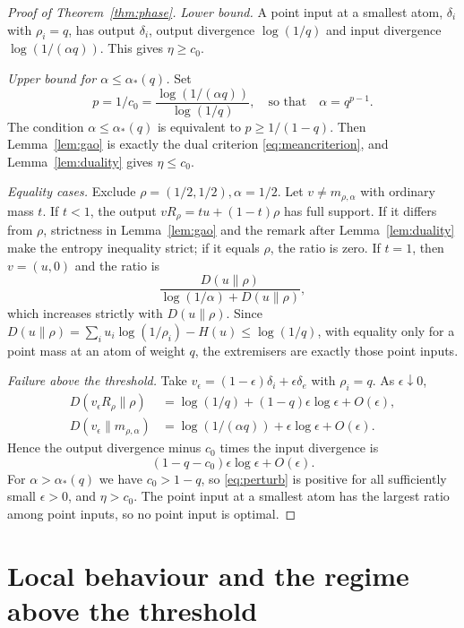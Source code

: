 \documentclass[11pt,a4paper]{article}
\numberwithin{equation}{section}
\theoremstyle{definition}
\theoremstyle{remark}
\newcommand{\KL}{D}
\newcommand{\mra}{m_{\rho,\alpha}}
\newcommand{\ac}{\alpha_*}
\begin{document}
\begin{proof}[Proof of Theorem~\ref{thm:phase}]
\emph{Lower bound.} A point input at a smallest atom, \(\delta_i\) with
\(\rho_i=q\), has output \(\delta_i\), output divergence \(\log(1/q)\) and
input divergence \(\log(1/(\alpha q))\). This gives \(\eta\ge c_0\).

\emph{Upper bound for \(\alpha\le\ac(q)\).} Set
\[
p=1/c_0=\frac{\log(1/(\alpha q))}{\log(1/q)},
\quad\text{so that}\quad \alpha=q^{p-1}.
\]
The condition \(\alpha\le\ac(q)\) is equivalent to \(p\ge1/(1-q)\). Then
Lemma~\ref{lem:gao} is exactly the dual criterion \eqref{eq:meancriterion},
and Lemma~\ref{lem:duality} gives \(\eta\le c_0\).

\emph{Equality cases.} Exclude \(\rho=(1/2,1/2),\alpha=1/2\). Let
\(v\ne\mra\) with ordinary mass \(t\). If \(t<1\), the output
\(vR_\rho=tu+(1-t)\rho\) has full support. If it differs from \(\rho\),
strictness in Lemma~\ref{lem:gao} and the remark after
Lemma~\ref{lem:duality} make the entropy inequality strict; if it equals
\(\rho\), the ratio is zero. If \(t=1\), then \(v=(u,0)\) and the ratio is
\[
\frac{\KL(u\|\rho)}{\log(1/\alpha)+\KL(u\|\rho)},
\]
which increases strictly with \(\KL(u\|\rho)\). Since
\(\KL(u\|\rho)=\sum_iu_i\log(1/\rho_i)-H(u)\le\log(1/q)\), with equality
only for a point mass at an atom of weight \(q\), the extremisers are
exactly those point inputs.

\emph{Failure above the threshold.} Take
\(v_\epsilon=(1-\epsilon)\delta_i+\epsilon\delta_e\) with \(\rho_i=q\).
As \(\epsilon\downarrow0\),
\begin{align*}
\KL(v_\epsilon R_\rho\|\rho)
 &=\log(1/q)+(1-q)\epsilon\log\epsilon+O(\epsilon),\\
\KL(v_\epsilon\|\mra)
 &=\log(1/(\alpha q))+\epsilon\log\epsilon+O(\epsilon).
\end{align*}
Hence the output divergence minus \(c_0\) times the input divergence is
\begin{equation}\label{eq:perturb}
(1-q-c_0)\epsilon\log\epsilon+O(\epsilon).
\end{equation}
For \(\alpha>\ac(q)\) we have \(c_0>1-q\), so \eqref{eq:perturb} is positive
for all sufficiently small \(\epsilon>0\), and \(\eta>c_0\). The point input
at a smallest atom has the largest ratio among point inputs, so no point
input is optimal.
\end{proof}

\section{Local behaviour and the regime above the threshold}\label{sec:supercritical}
\end{document}
